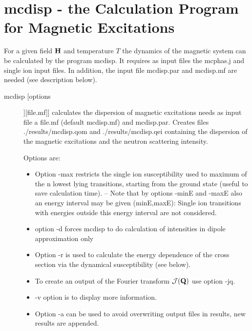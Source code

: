 
\section{{\prg mcdisp} - the Calculation Program for Magnetic Excitations}\label{mcdisp}

For a given field $\mathbf H$ and temperature $T$ the dynamics of the magnetic system
can be calculated by the program {\prg mcdisp}. It requires as input files
the {\prg mcphas.j} and single ion input files. In addition, the input file
{\prg mcdisp.par} and {\prg mcdisp.mf} are needed (see description below).

\begin{description}
\item [\prg mcdisp [options]][file.mf]]  
      calculates the dispersion of magnetic excitations
	  needs as input file a {\prg file.mf} (default {\prg mcdisp.mf})
				and {\prg mcdisp.par}.  Creates  
				files {\prg ./results/mcdisp.qom} and {\prg ./results/mcdisp.qei}
				containing the dispersion of the magnetic excitations and the neutron
				scattering intensity. 
				
				Options are:
				 \begin{itemize}
				\item Option {\prg -max} restricts the single ion susceptibility
				used to maximum of  the n lowest lying transitions, starting
				from the ground state (useful to save calculation time).
--
			        Note that by options {\prg -minE} and {\prg -maxE}
				also an energy interval may be given (minE,maxE):
				Single ion transitions with energies outside this
				energy interval are not considered.
                                               \item option {\prg -d} forces mcdisp to do calculation of intensities in dipole approximation only				
				\item Option {\prg -r} is used to calculate the energy dependence
				of the cross section via the dynamical susceptibility (see below).
				\item To create an output
				of the Fourier transform ${\mathcal J}({\mathbf Q})$ use option
				{\prg -jq}. 
				\item {\prg -v} option is to display more information.
                                
				\item Option {\prg -a} can be used to avoid overwriting output files in results, new results
				are appended.
								

\end{itemize}
\end{description}
